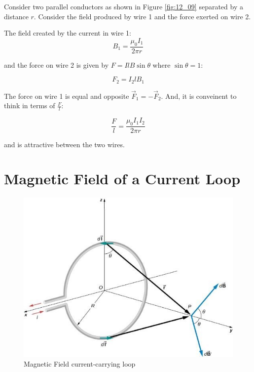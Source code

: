 \documentclass[14pt]{memoir}
\begin{document}
Consider two parallel conductors as shown in Figure \ref{fig:12_09} separated by a distance $r$. Consider the field produced by wire 1 and the force exerted on wire 2.

The field created by the current in wire 1:
\begin{equation}
B_1 = \frac{\mu_0 I_1}{2 \pi r}
\end{equation}

and the force on wire 2 is given by $F = IlB\sin{\theta}$ where $\sin{\theta} = 1$:

\begin{equation}
F_2 = I_2 l B_1
\end{equation}

The force on wire 1 is equal and opposite $\vec{F}_1 = -\vec{F}_2$. And, it is conveinent to think in terms of $\frac{F}{l}$:

\begin{equation}
\frac{F}{l} = \frac{\mu_0 I_1 I_2}{2 \pi r}
\end{equation}

and is attractive between the two wires. 

\section{Magnetic Field of a Current Loop}

\begin{figure}[H]
\begin{center}
\includegraphics[scale=0.4]{fig/fig_12_11.jpg}
\caption{Magnetic Field current-carrying loop}
\label{fig:12_11}
\end{center}
\end{figure}
\end{document}
